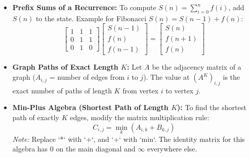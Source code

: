 \begin{itemize}
    \item \textbf{Prefix Sums of a Recurrence:} 
    To compute $S(n) = \sum_{i=0}^{n} f(i)$, add $S(n)$ to the state. Example for Fibonacci $S(n) = S(n-1) + f(n)$:
    \[
    \begin{bmatrix}
    1 & 1 & 1 \\
    0 & 1 & 1 \\
    0 & 1 & 0 
    \end{bmatrix}
    \begin{bmatrix}
    S(n-1) \\ f(n) \\ f(n-1)
    \end{bmatrix}
    =
    \begin{bmatrix}
    S(n) \\ f(n+1) \\ f(n)
    \end{bmatrix}
    \]

    \item \textbf{Graph Paths of Exact Length $K$:} 
    Let $A$ be the adjacency matrix of a graph ($A_{i,j}$ = number of edges from $i$ to $j$). 
    The value at $(A^K)_{i,j}$ is the exact number of paths of length $K$ from vertex $i$ to vertex $j$.

    \item \textbf{Min-Plus Algebra (Shortest Path of Length $K$):} 
    To find the shortest path of exactly $K$ edges, modify the matrix multiplication rule:
    \[ C_{i,j} = \min_{k} (A_{i,k} + B_{k,j}) \]
    \textit{Note:} Replace `*` with `+`, and `+` with `min`. The identity matrix for this algebra has $0$ on the main diagonal and $\infty$ everywhere else.
\end{itemize}